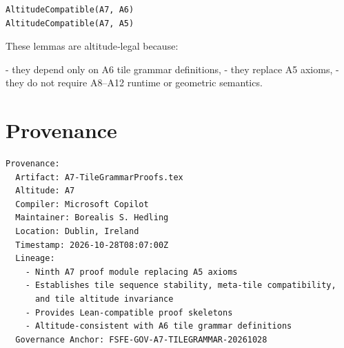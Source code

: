 \documentclass[11pt]{article}
\begin{document}
\begin{verbatim}
AltitudeCompatible(A7, A6)
AltitudeCompatible(A7, A5)
\end{verbatim}

These lemmas are altitude‑legal because:

- they depend only on A6 tile grammar definitions,
- they replace A5 axioms,
- they do not require A8–A12 runtime or geometric semantics.

\newpage


\section*{Provenance}

\begin{verbatim}
Provenance:
  Artifact: A7-TileGrammarProofs.tex
  Altitude: A7
  Compiler: Microsoft Copilot
  Maintainer: Borealis S. Hedling
  Location: Dublin, Ireland
  Timestamp: 2026-10-28T08:07:00Z
  Lineage:
    - Ninth A7 proof module replacing A5 axioms
    - Establishes tile sequence stability, meta-tile compatibility,
      and tile altitude invariance
    - Provides Lean-compatible proof skeletons
    - Altitude-consistent with A6 tile grammar definitions
  Governance Anchor: FSFE-GOV-A7-TILEGRAMMAR-20261028
\end{verbatim}
\end{document}
